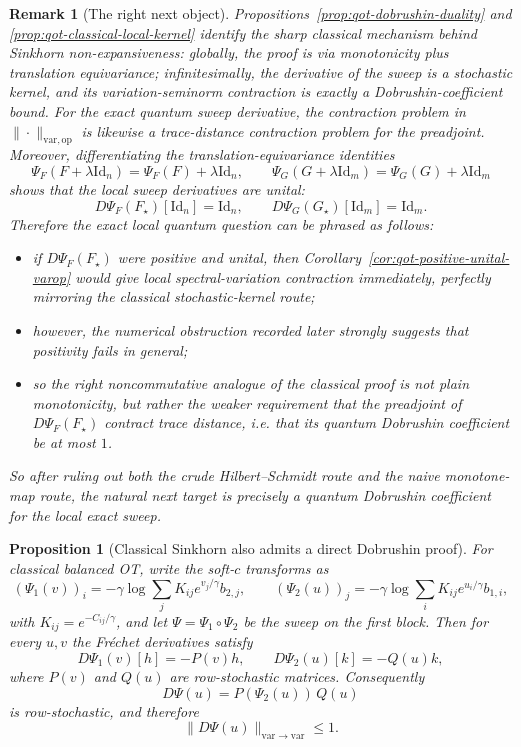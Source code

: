 \documentclass[11pt]{article}
\newcommand{\Id}{\mathrm{Id}}
\newcommand{\op}{\mathrm{op}}
\newcommand{\varop}{\mathrm{var},\op}
\theoremstyle{plain}
\newtheorem{proposition}{Proposition}[section]
\newtheorem{remark}{Remark}[section]
\begin{document}
\begin{remark}[The right next object]
\label{rem:qot-right-next-object}
Propositions~\ref{prop:qot-dobrushin-duality} and \ref{prop:qot-classical-local-kernel} identify the sharp classical mechanism behind Sinkhorn non-expansiveness:
globally, the proof is via monotonicity plus translation equivariance; infinitesimally, the derivative of the sweep is a stochastic kernel, and its variation-seminorm contraction is exactly a Dobrushin-coefficient bound.
For the exact quantum sweep derivative, the contraction problem in $\|\cdot\|_{\varop}$ is likewise a trace-distance contraction problem for the preadjoint.
Moreover, differentiating the translation-equivariance identities
\[
\Psi_F(F+\lambda \Id_n)=\Psi_F(F)+\lambda \Id_n,
\qquad
\Psi_G(G+\lambda \Id_m)=\Psi_G(G)+\lambda \Id_m
\]
shows that the local sweep derivatives are unital:
\[
D\Psi_F(F_\star)[\Id_n]=\Id_n,
\qquad
D\Psi_G(G_\star)[\Id_m]=\Id_m.
\]
Therefore the exact local quantum question can be phrased as follows:
\begin{itemize}[leftmargin=1.5em]
\item if $D\Psi_F(F_\star)$ were positive and unital, then Corollary~\ref{cor:qot-positive-unital-varop} would give local spectral-variation contraction immediately, perfectly mirroring the classical stochastic-kernel route;
\item however, the numerical obstruction recorded later strongly suggests that positivity fails in general;
\item so the right noncommutative analogue of the classical proof is \emph{not} plain monotonicity, but rather the weaker requirement that the preadjoint of $D\Psi_F(F_\star)$ contract trace distance, i.e. that its quantum Dobrushin coefficient be at most $1$.
\end{itemize}
So after ruling out both the crude Hilbert--Schmidt route and the naive monotone-map route, the natural next target is precisely a \emph{quantum Dobrushin coefficient} for the local exact sweep.
\end{remark}

\begin{proposition}[Classical Sinkhorn also admits a direct Dobrushin proof]
\label{prop:classical-sinkhorn-dobrushin}
For classical balanced OT, write the soft-$c$ transforms as
\[
(\Psi_1(v))_i
=
-\gamma \log \sum_j K_{ij} e^{v_j/\gamma} b_{2,j},
\qquad
(\Psi_2(u))_j
=
-\gamma \log \sum_i K_{ij} e^{u_i/\gamma} b_{1,i},
\]
with $K_{ij}=e^{-C_{ij}/\gamma}$, and let $\Psi=\Psi_1\circ\Psi_2$ be the sweep on the first block.
Then for every $u,v$ the Fr\'echet derivatives satisfy
\[
D\Psi_1(v)[h] = -P(v)h,
\qquad
D\Psi_2(u)[k] = -Q(u)k,
\]
where $P(v)$ and $Q(u)$ are row-stochastic matrices.
Consequently
\[
D\Psi(u)=P(\Psi_2(u))\,Q(u)
\]
is row-stochastic, and therefore
\[
\|D\Psi(u)\|_{\mathrm{var}\to \mathrm{var}}\le 1.
\]
\end{proposition}
\end{document}
